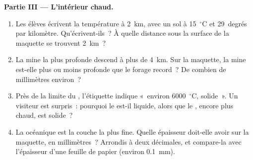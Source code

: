 \begin{problem}
\medskip
\noindent\textbf{Partie III --- L'intérieur chaud.}
\begin{enumerate}[resume]
  \item Les élèves écrivent la température à 2~km, avec un sol à
        15~$^\circ$C et 29~degrés par kilomètre. Qu'écrivent-ils~? À quelle
        distance sous la surface de la maquette se trouvent 2~km~?
  \item La mine la plus profonde descend à plus de 4~km. Sur la maquette,
        la mine est-elle plus ou moins profonde que le forage record~? De
        combien de millimètres environ~?
  \item Près de la limite du , l'étiquette indique «~environ
        6000~$^\circ$C, solide~». Un visiteur est surpris~: pourquoi le
         est-il liquide, alors que le , encore
        plus chaud, est solide~?
  \item La  océanique est la couche la plus fine. Quelle épaisseur
        doit-elle avoir sur la maquette, en millimètres~? Arrondis à deux
        décimales, et compare-la avec l'épaisseur d'une feuille de papier
        (environ 0.1~mm).
\end{enumerate}
\end{problem}

